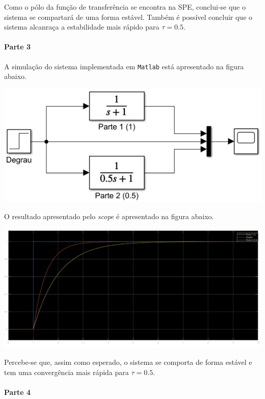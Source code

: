 \documentclass[
]{book}
\theoremstyle{definition}
\theoremstyle{definition}
\theoremstyle{definition}
\theoremstyle{remark}
\begin{document}
Como o pólo da função de transferência se encontra na SPE, conclui-se que o sistema se compartará de uma forma estável. Também é possível concluir que o sistema alcanraça a estabilidade mais rápido para \(\tau = 0.5\).

\hypertarget{parte-3}{%
\paragraph{Parte 3}\label{parte-3}}

A simulação do sistema implementada em \texttt{Matlab} está apresentado na figura abaixo.

\includegraphics{Imagens/Lab2/sim1.jpg}

O resultado apresentado pelo \emph{scope} é apresentado na figura abaixo.

\includegraphics{Imagens/Lab2/resultSim1.jpg}

Percebe-se que, assim como esperado, o sistema se comporta de forma estável e tem uma convergência mais rápida para \(\tau = 0.5\).

\hypertarget{parte-4}{%
\paragraph{Parte 4}\label{parte-4}}
\end{document}

